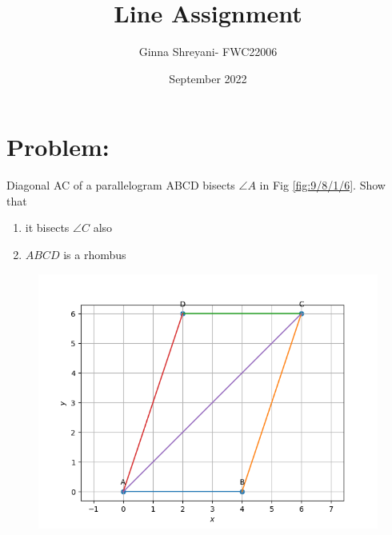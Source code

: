 \documentclass[a4paper,12pt,twocolumn]{article}
\title{Line Assignment}
\author{Ginna Shreyani- FWC22006}
\date{September 2022}
\let\vec\mathbf
\newcommand{\myvec}[1]{\ensuremath{\begin{pmatrix}#1\end{pmatrix}}}
\begin{document}
\maketitle
\section{Problem:}
\fi
Diagonal AC of a parallelogram ABCD bisects $\angle{A}$ in Fig \eqref{fig:9/8/1/6}. Show that 
\begin{enumerate}
	\item	it bisects $\angle{C}$ also
	\item $ABCD$ is a rhombus
\end{enumerate}
\begin{figure}[!h]
	\centering
	\includegraphics[width=\columnwidth]{chapters/9/8/1/6/figs/parallel.png}
	\caption{}
	\label{fig:9/8/1/6}
\end{figure}
\solution  

\iffalse
\maketitle
\end{document}
